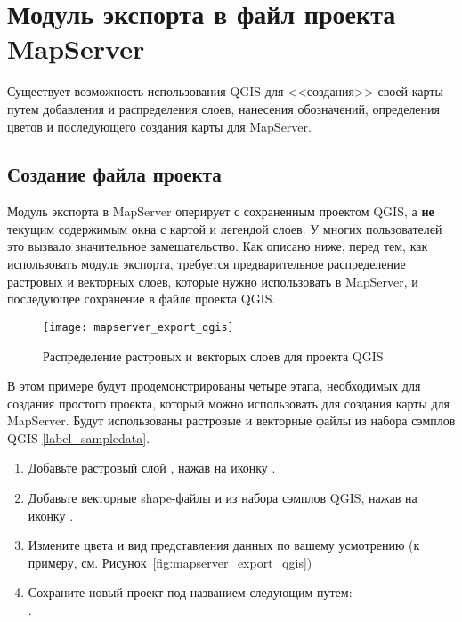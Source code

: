 
\section{Модуль экспорта в файл проекта MapServer}\label{sec:mapserver_export}


Существует возможность использования QGIS для <<создания>> своей карты
путем добавления и распределения слоев, нанесения обозначений,
определения цветов и последующего создания карты для MapServer.

\subsection{Создание файла проекта}

Модуль экспорта в MapServer оперирует с сохраненным проектом QGIS, а
\textbf{не} текущим содержимым окна с картой и легендой слоев. У
многих пользователей это вызвало значительное замешательство. Как
описано ниже, перед тем, как использовать модуль экспорта, требуется
предварительное распределение растровых и векторных слоев, которые нужно
использовать в MapServer, и последующее сохранение в файле проекта QGIS.

\begin{figure}[ht]
\centering
  \texttt{[image: mapserver\_export\_qgis]}
   \caption{Распределение растровых и векторых слоев для проекта QGIS \wincaption}
  \label{fig:mapserver_export_qgs}
\end{figure}

В этом примере будут продемонстрированы четыре этапа, необходимых для
создания простого проекта, который можно использовать для создания карты
для MapServer. Будут использованы растровые и векторные файлы из набора
сэмплов QGIS \ref{label_sampledata}.

\begin{enumerate}
\item Добавьте растровый слой , нажав на иконку
.
\item Добавьте векторные shape-файлы 
и  из набора сэмплов QGIS, нажав на иконку
.
\item Измените цвета и вид представления данных по вашему усмотрению
(к примеру, см. Рисунок~\ref{fig:mapserver_export_qgis})
\item Сохраните новый проект под названием 
следующим путем: \\
 \arrow {}.
\end{enumerate}

